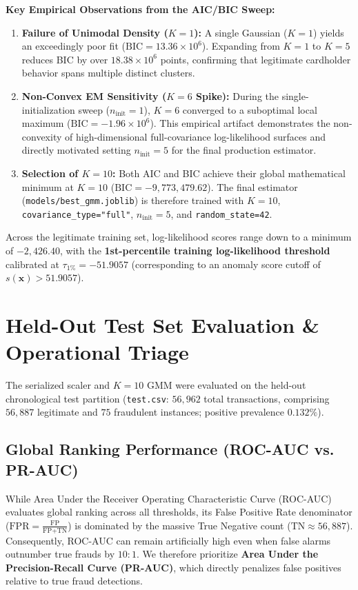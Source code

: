 \documentclass[11pt, a4paper]{article}
\begin{document}
\textbf{Key Empirical Observations from the AIC/BIC Sweep:}
\begin{enumerate}
    \item \textbf{Failure of Unimodal Density ($K=1$):} A single Gaussian ($K=1$) yields an exceedingly poor fit ($\text{BIC} = 13.36 \times 10^6$). Expanding from $K=1$ to $K=5$ reduces BIC by over $18.38 \times 10^6$ points, confirming that legitimate cardholder behavior spans multiple distinct clusters.
    \item \textbf{Non-Convex EM Sensitivity ($K=6$ Spike):} During the single-initialization sweep ($n_{\text{init}} = 1$), $K=6$ converged to a suboptimal local maximum ($\text{BIC} = -1.96 \times 10^6$). This empirical artifact demonstrates the non-convexity of high-dimensional full-covariance log-likelihood surfaces and directly motivated setting $n_{\text{init}} = 5$ for the final production estimator.
    \item \textbf{Selection of $K=10$:} Both AIC and BIC achieve their global mathematical minimum at $K = 10$ ($\text{BIC} = -9,773,479.62$). The final estimator (\texttt{models/best\_gmm.joblib}) is therefore trained with $K = 10$, \texttt{covariance\_type="full"}, $n_{\text{init}} = 5$, and \texttt{random\_state=42}.
\end{enumerate}

Across the legitimate training set, log-likelihood scores range down to a minimum of $-2,426.40$, with the \textbf{1st-percentile training log-likelihood threshold} calibrated at $\tau_{1\%} = -51.9057$ (corresponding to an anomaly score cutoff of $s(\mathbf{x}) > 51.9057$).

\section{Held-Out Test Set Evaluation \& Operational Triage}

The serialized scaler and $K=10$ GMM were evaluated on the held-out chronological test partition (\texttt{test.csv}: $56,962$ total transactions, comprising $56,887$ legitimate and $75$ fraudulent instances; positive prevalence $0.132\%$).

\subsection{Global Ranking Performance (ROC-AUC vs. PR-AUC)}
While Area Under the Receiver Operating Characteristic Curve (ROC-AUC) evaluates global ranking across all thresholds, its False Positive Rate denominator ($\text{FPR} = \frac{\text{FP}}{\text{FP} + \text{TN}}$) is dominated by the massive True Negative count ($\text{TN} \approx 56,887$). Consequently, ROC-AUC can remain artificially high even when false alarms outnumber true frauds by $10:1$. We therefore prioritize \textbf{Area Under the Precision-Recall Curve (PR-AUC)}, which directly penalizes false positives relative to true fraud detections.
\end{document}
